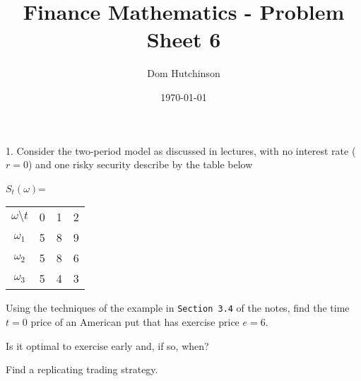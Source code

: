 \documentclass[11pt,a4paper]{article}
\begin{document}
\questionsfalse

\title{Finance Mathematics - Problem Sheet 6}
\author{Dom Hutchinson}
\date{\today}
\maketitle

\begin{question}{1.}
  Consider the two-period model as discussed in lectures, with no interest rate ($r=0$) and one risky security describe by the table below
  \begin{center}
    $S_t(\omega)$=
    \begin{tabular}{c|ccc}
      $\omega\setminus t$&0&1&2\\
      $\omega_1$&5&8&9\\
      $\omega_2$&5&8&6\\
      $\omega_3$&5&4&3
    \end{tabular}
  \end{center}
  Using the techniques of the example in \texttt{Section 3.4} of the notes, find the time $t=0$ price of an American put that has exercise price $e=6$.
  \par Is it optimal to exercise early and, if so, when?
  \par Find a replicating trading strategy.
\end{question}
\end{document}

